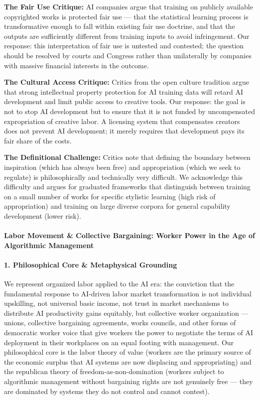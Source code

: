 \textbf{The Fair Use Critique:} AI companies argue that training on
publicly available copyrighted works is protected fair use --- that the
statistical learning process is transformative enough to fall within
existing fair use doctrine, and that the outputs are sufficiently
different from training inputs to avoid infringement. Our response: this
interpretation of fair use is untested and contested; the question
should be resolved by courts and Congress rather than unilaterally by
companies with massive financial interests in the outcome.

\textbf{The Cultural Access Critique:} Critics from the open culture
tradition argue that strong intellectual property protection for AI
training data will retard AI development and limit public access to
creative tools. Our response: the goal is not to stop AI development but
to ensure that it is not funded by uncompensated expropriation of
creative labor. A licensing system that compensates creators does not
prevent AI development; it merely requires that development pays its
fair share of the costs.

\textbf{The Definitional Challenge:} Critics note that defining the
boundary between inspiration (which has always been free) and
appropriation (which we seek to regulate) is philosophically and
technically very difficult. We acknowledge this difficulty and argues
for graduated frameworks that distinguish between training on a small
number of works for specific stylistic learning (high risk of
appropriation) and training on large diverse corpora for general
capability development (lower risk).

\paragraph{Labor Movement \& Collective Bargaining: Worker Power in the
Age of Algorithmic
Management}\label{labor-movement-collective-bargaining-worker-power-in-the-age-of-algorithmic-management}

\paragraph{1. Philosophical Core \& Metaphysical
Grounding}\label{philosophical-core-metaphysical-grounding-39}

We represent organized labor applied to the AI era: the conviction that
the fundamental response to AI-driven labor market transformation is not
individual upskilling, not universal basic income, not trust in market
mechanisms to distribute AI productivity gains equitably, but collective
worker organization --- unions, collective bargaining agreements, works
councils, and other forms of democratic worker voice that give workers
the power to negotiate the terms of AI deployment in their workplaces on
an equal footing with management. Our philosophical core is the labor
theory of value (workers are the primary source of the economic surplus
that AI systems are now displacing and appropriating) and the republican
theory of freedom-as-non-domination (workers subject to algorithmic
management without bargaining rights are not genuinely free --- they are
dominated by systems they do not control and cannot contest).

